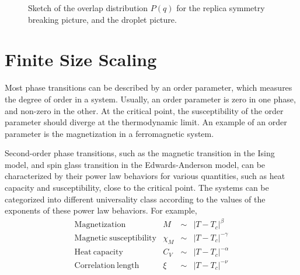 \begin{figure}
  \centering 
  \hspace{0.5cm}
  \caption{Sketch of the overlap distribution $P(q)$ for the replica symmetry 
breaking picture, and the droplet picture.}
  \label{fig:overlap}
\end{figure}

\section{Finite Size Scaling}
Most phase transitions can be described by an order parameter, which measures
the degree of order in a system. Usually, an order parameter is zero in one phase,
and non-zero in the other. At the critical point, the susceptibility of the order
parameter should diverge at the thermodynamic limit. An example of an order parameter is the 
magnetization in a ferromagnetic system. 
 
Second-order phase transitions, such as the magnetic transition in the Ising model, and 
spin glass transition in the Edwards-Anderson model, can be characterized by their 
power law behaviors for various quantities, such as heat capacity and susceptibility,  
close to the critical point. The systems can be categorized into different universality 
class according to the values of the exponents of these power law behaviors. For example, 
\begin{equation}
  \label{eq:20}
  \begin{array}{lrcl}
    \mathrm{Magnetization}& M& \sim& \left|T-T_c\right|^\beta\\
    \mathrm{Magnetic~susceptibility}& \chi_M& \sim& \left|T-T_c\right|^{-\gamma}\\
    \mathrm{Heat~capacity}& C_V& \sim& \left|T-T_c\right|^{-\alpha}\\
    \mathrm{Correlation~length}& \xi& \sim& \left|T-T_c\right|^{-\nu}
  \end{array}
\end{equation}

